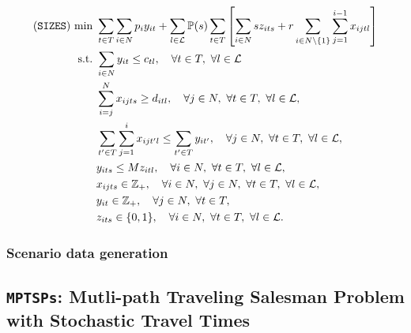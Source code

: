 \begin{subequations}
	\begin{align}
	(\texttt{SIZES})\ \textrm{min}\ &\sum_{t\in T}\sum_{i\in N} p_i y_{it} + \sum_{l\in \mathcal{L}} \PP(s)\sum_{t\in T}\left[\sum_{i\in N} sz_{its}+r\sum_{i\in N\backslash\{1\}}\sum_{j=1}^{i-1}x_{ijtl}\right] \\
	\textrm{s.t.}\ &\sum_{i\in N}y_{it}\le c_{tl},\quad \forall t\in T,\ \forall l\in \mathcal{L} \\
	&\sum_{i=j}^N x_{ijts} \ge d_{itl},\quad\forall j\in N,\ \forall t\in T,\  \forall l\in \mathcal{L},\\
	&\sum_{t'\in T}\sum_{j=1}^{i}x_{ijt'l}\le\sum_{t'\in T}y_{it'}, \quad\forall j\in N,\ \forall t\in T,\ \forall l\in \mathcal{L},\\
	&y_{its}\le Mz_{itl},\quad\forall i \in N,\ \forall t\in T,\ \forall l\in \mathcal{L},\\
	&x_{ijts}\in\mathbb{Z}_+,\quad\forall i\in N,\ \forall j\in N,\ \forall t\in T,\ \forall l\in \mathcal{L},\\
	&y_{it}\in\mathbb{Z}_+,\quad \forall j\in N,\ \forall t\in T,\\
	&z_{its}\in\{0,1\},\quad\forall i\in N,\ \forall t\in T,\ \forall l\in \mathcal{L}.
	\end{align}
\end{subequations}

\subsubsection{Scenario data generation}

\subsection{\texttt{MPTSPs}: Mutli-path Traveling Salesman Problem with Stochastic Travel Times}
